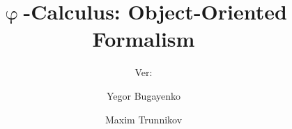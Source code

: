 \documentclass[acmsmall,nonacm,11pt]{acmart}
\title{\texorpdfstring{\(\upvarphi\)}{phi}-Calculus: Object-Oriented Formalism}
\subtitle{%
  Ver:
  \texorpdfstring{
    \href{https://github.com/REPOSITORY/releases/tag/0.0.0}
      {\ff{0.0.0}}
  }{0.0.0}
}
\author{Yegor Bugayenko}
\affiliation{\institution{Huawei}\city{Moscow}\country{Russia}}
\author{Maxim Trunnikov}
\affiliation{\institution{Huawei}\city{Moscow}\country{Russia}}
\begin{document}


\maketitle

















{\raggedright

\begin{multicols}{2}

\end{multicols}}
\vfill\eject

\appendix




\end{document}
